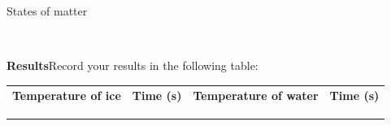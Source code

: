 \begin{fexperiment}{States of matter}
{\\
\par 
\pagebreak
\label{m38736*eip-282}
	\par
      \label{m38736*eip-863}\noindent{}\textbf{Results}Record your results in the following table:
          \begin{table}[H]
        \begin{center}
      \label{m38736*uid434}
    \noindent
      \tablelasttail{}
      \begin{xtabular}[t]{|l|l|l|l|}\hline
                \textbf{Temperature of ice}
               &
                \textbf{Time (s)}
               &
                \textbf{Temperature of water}
               &
                \textbf{Time (s)}
     \tabularnewline{}
         &
         &
         &
     \tabularnewline{}
         &
         &
         &
     \tabularnewline{}
         &
         &
         &
     \tabularnewline{}

\end{xtabular}
\end{center}
\end{table}}
\end{fexperiment}
